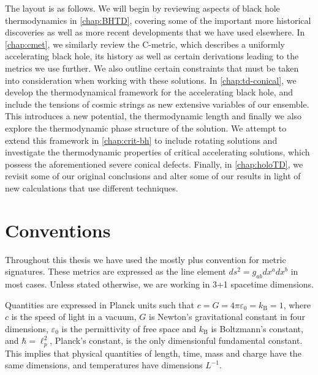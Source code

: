 \documentclass[
twoside,
openright,
frontopenright
]{dmathesis}
\begin{document}
The layout is as follows. We will begin by reviewing aspects of black hole
thermodynamics in \cref{chap:BHTD}, covering some of the important more
historical discoveries as well as more recent developments that we have used
elsewhere. In \cref{chap:cmet}, we similarly review the C-metric, which
describes a uniformly accelerating black hole, its history as well as certain
derivations leading to the metrics we use further. We also outline certain
constraints that must be taken into consideration when working with these
solutions. In \cref{chap:td-conical}, we develop the thermodynamical framework
for the accelerating black hole, and include the tensions of cosmic strings as
new extensive variables of our ensemble. This introduces a new potential, the
thermodynamic length and finally we also explore the thermodynamic phase
structure of the solution. We attempt to extend this framework in
\cref{chap:crit-bh} to include rotating solutions and investigate the
thermodynamic properties of critical accelerating solutions, which possess the
aforementioned severe conical defects. Finally, in \cref{chap:holoTD}, we
revisit some of our original conclusions and alter some of our results in light
of new calculations that use different techniques.

\section*{Conventions}
 Throughout this thesis we have used
the mostly plus convention for metric signatures. These metrics are expressed as
the line element $ds^2 = g_{ab}dx^adx^b$ in most cases. Unless stated otherwise,
we are working in 3+1 spacetime dimensions.

Quantities are expressed in Planck units such that
$c = G = 4\pi\varepsilon_0 = k_\mathrm{B} = 1$, where $c$ is the speed of light
in a vacuum, $G$ is Newton's gravitational constant in four dimensions,
$\varepsilon_0$ is the permittivity of free space and $k_\mathrm{B}$ is
Boltzmann's constant, and $\hbar = \ell_p^2$, Planck's constant, is the only
dimensionful fundamental constant. This implies that physical quantities of
length, time, mass and charge have the same dimensions, and temperatures have
dimensions $L^{-1}$.
\end{document}
